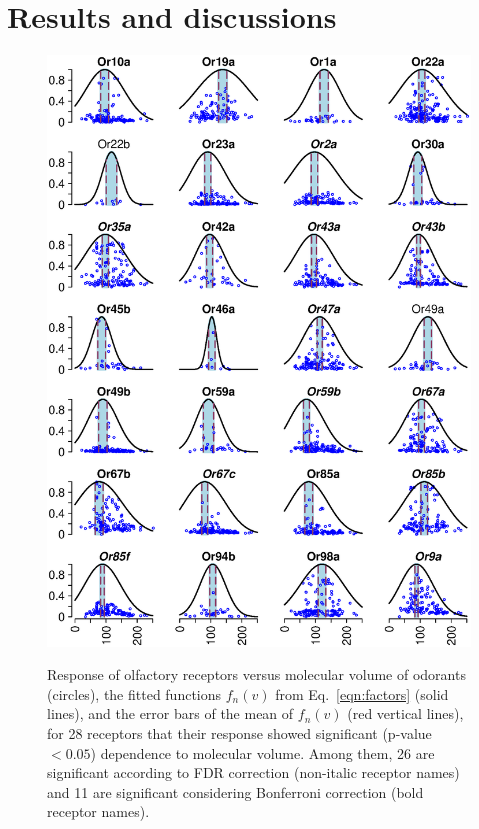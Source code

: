 \documentclass[11pt]{article} %
\newcommand{\numberofreceptors}{ 28 }
\newcommand{\bonferroni}{ 11 }
\newcommand{\fdr}{ 26 }
\begin{document}
\section*{Results and discussions}
\begin{figure}
	\centering
		\includegraphics[width=0.8 \textwidth]{fig/vol-res-}
		\label{fig:vol-res:all}		
	\caption{Response of olfactory receptors  versus molecular volume of odorants (circles),  
			the fitted functions $f_n(v)$ from Eq.~\ref{eqn:factors} (solid lines), 
			and the error bars of the mean of $f_n(v)$ (red vertical lines), 
			for \numberofreceptors receptors that their response showed significant (p-value $<0.05$) dependence to molecular volume. 
			Among them, \fdr are significant according to FDR correction (non-italic receptor names) and 
			\bonferroni are significant considering Bonferroni correction (bold receptor names).
		}
	\label{fig:vol-res}
\end{figure}
\end{document}
